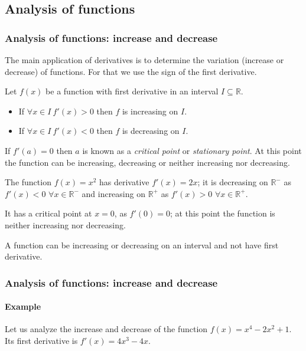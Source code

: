 \subsection{Analysis of functions}
\begin{frame}
	\frametitle{Analysis of functions: increase and decrease}
	The main application of derivatives is to determine the variation (increase or decrease) of functions. 
	For that we use the sign of the first derivative.  
	\begin{theorem}
		Let $f(x)$ be a function with first derivative in an interval $I\subseteq \mathbb{R}$.
		\begin{itemize}
			\item If $\forall x\in I\ f'(x)> 0$ then $f$ is increasing on $I$.
			\item If $\forall x\in I\ f'(x)< 0$ then $f$ is decreasing on $I$.
		\end{itemize}
	\end{theorem}
	If $f'(a)=0$ then $a$ is known as a \emph{critical point} or \emph{stationary point}.
	At this point the function can be increasing, decreasing or neither increasing nor decreasing. 
	
	The function $f(x)=x^2$ has derivative $f'(x)=2x$; it is decreasing on $\mathbb{R}^-$ as $f'(x)< 0$ $\forall x\in \mathbb{R}^-$  and increasing on $\mathbb{R}^+$ as $f'(x)> 0$ $\forall x\in \mathbb{R}^+$.
	
	It has a critical point at $x=0$, as $f'(0)=0$; at this point the function is neither increasing nor decreasing.
	
	 {A function can be increasing or decreasing on an interval and not have first derivative.}
\end{frame}


\begin{frame}
	\frametitle{Analysis of functions: increase and decrease}
	\framesubtitle{Example}
	Let us analyze the increase and decrease of the function $f(x)=x^4-2x^2+1$. 
	Its first derivative is $f'(x)=4x^3-4x$.
	\begin{center}
		\scalebox{0.9}{}
	\end{center}
\end{frame}



